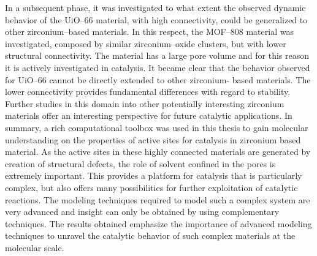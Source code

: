 \npar
In a subsequent phase, it was investigated to what extent the observed dynamic behavior of the UiO--66 material, with high connectivity, could be generalized to other zirconium--based materials. 
In this respect, the MOF--808 material was investigated, composed by similar zirconium--oxide clusters, but with lower structural connectivity. The material has a large pore volume and for this reason it is actively investigated in catalysis. It became clear that the behavior observed for UiO--66 cannot be directly extended to other zirconium- based materials. The lower connectivity provides fundamental differences with regard to stability. Further studies in this domain into other potentially interesting zirconium materials offer an interesting perspective for future catalytic applications.
\npar
In summary, a rich computational toolbox was used in this thesis to gain molecular understanding on the properties of active sites for catalysis in zirconium based material. As the active sites in these highly connected materials are generated by creation of structural defects, the role of solvent confined in the pores is extremely important. This provides a platform for catalysis that is particularly complex, but also offers many possibilities for further exploitation of catalytic reactions. The modeling techniques required to model such a complex system are very advanced and insight can only be obtained by using complementary techniques. The results obtained emphasize the importance of advanced modeling techniques to unravel the catalytic behavior of such complex materials at the molecular scale.
